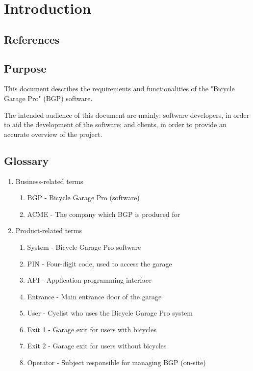 \documentclass[12pt,titlepage]{article}
\begin{document}


\maketitle
\newpage
\tableofcontents
\thispagestyle{empty}
\setcounter{page}{0}
\newpage

\section{Introduction}
\subsection{References}
\subsection{Purpose}
This document describes the requirements and functionalities of the "Bicycle Garage Pro" (BGP) software.

The intended audience of this document are mainly: software developers, in order to aid the development of the software; and clients, in order to provide an accurate overview of the project.
\subsection{Glossary}
\begin{enumerate}
	\item Business-related terms
	\begin{enumerate}
		\item BGP - Bicycle Garage Pro (software)
		\item ACME - The company which BGP is produced for
	\end{enumerate}

	\item Product-related terms
	\begin{enumerate}
	\item System - Bicycle Garage Pro software
	\item PIN - Four-digit code, used to access the garage
	\item API - Application programming interface
	\item Entrance - Main entrance door of the garage
	\item User - Cyclist who uses the Bicycle Garage Pro system
	\item Exit 1 - Garage exit for users with bicycles
	\item Exit 2 - Garage exit for users without bicycles
	\item Operator - Subject responsible for managing BGP (on-site)
	\end{enumerate}
\end{enumerate}
\end{document}
